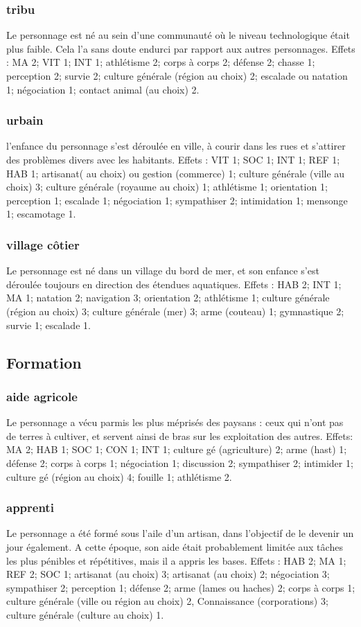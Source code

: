 \documentclass[10pt,a4paper,twocolumn]{book}
\begin{document}
\subsubsection{tribu}
Le personnage est né au sein d’une communauté où le niveau technologique était plus faible. Cela l’a sans doute endurci par rapport aux autres personnages.
Effets : MA 2; VIT 1; INT 1; athlétisme 2; corps à corps 2; défense 2; chasse 1; perception 2; survie 2; culture générale (région au choix) 2; escalade ou natation 1; négociation 1; contact animal (au choix) 2.
\subsubsection{urbain}
l’enfance du personnage s’est déroulée en ville, à courir dans les rues et s’attirer des problèmes divers avec les habitants.
Effets : VIT 1; SOC 1; INT 1; REF 1; HAB 1; artisanat( au choix) ou gestion (commerce) 1; culture générale (ville au choix) 3; culture générale (royaume au choix) 1; athlétisme 1; orientation 1; perception 1; escalade 1; négociation 1; sympathiser 2; intimidation 1; mensonge 1; escamotage 1.
\subsubsection{village côtier}
Le personnage est né dans un village du bord de mer, et son enfance s’est déroulée toujours en direction des étendues aquatiques.
Effets : HAB 2; INT 1; MA 1; natation 2; navigation 3; orientation 2; athlétisme 1; culture générale (région au choix) 3; culture générale (mer) 3; arme (couteau) 1; gymnastique 2; survie 1; escalade 1.

\subsection{Formation}
\subsubsection{aide agricole}
Le personnage a vécu parmis les plus méprisés des paysans : ceux qui n’ont pas de terres à cultiver, et servent ainsi de bras sur les exploitation des autres.
Effets: MA 2; HAB 1; SOC 1; CON 1; INT 1; culture gé (agriculture) 2; arme (hast) 1; défense 2; corps à corps 1; négociation 1; discussion 2; sympathiser 2; intimider 1; culture gé (région au choix) 4; fouille 1; athlétisme 2.
\subsubsection{apprenti}
Le personnage a été formé sous l’aile d’un artisan, dans l’objectif de le devenir un jour également. A cette époque, son aide était probablement limitée aux tâches les plus pénibles et répétitives, mais il a appris les bases.
Effets : HAB 2; MA 1; REF 2; SOC 1; artisanat (au choix) 3; artisanat (au choix) 2; négociation 3; sympathiser 2; perception 1; défense 2; arme (lames ou haches) 2; corps à corps 1; culture générale (ville ou région au choix) 2, Connaissance (corporations) 3; culture générale (culture au choix) 1.
\end{document}
